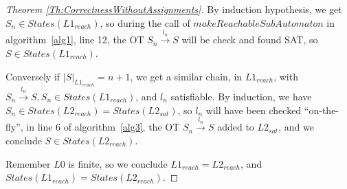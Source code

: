 \documentclass[smallcondensed]{svjour3}
\newcommand{\noteInEM}[2][inline,color=green!40]{\todo[#1]{{\bf Eric: } {#2}}}
\begin{document}
\begin{proof}[Theorem \ref{Th:CorrectnessWithoutAssignments}]
  By induction hypothesis, we get $S_{n} \in States(L1_{reach})$, so during the
  call of $makeReachableSubAutomaton$ in algorithm~\ref{alg1}, line 12, the OT
  $S_n \xrightarrow{l_{n}}S$ will be check and found SAT, so
  $S \in States(L1_{reach})$. 

  Conversely if $|S|_{L1_{reach}}=n+1$, we get a similar chain, in
  $L1_{reach}$, with $S_n \xrightarrow{l_{n}}S, S_n \in
  States(L1_{reach})$, and $l_n$ satisfiable. By induction, we have
  $S_n \in States(L2_{reach})=States(L2_{sat})$, so $l_n$ will have
  been checked ``on-the-fly'', in line 6 of algorithm~\ref{alg3},
  the OT $S_n \xrightarrow{l_{n}}S$ added to $L2_{sat}$, and we
  conclude $S \in States(L2_{reach})$.
  
Remember $L0$ is finite, so we conclude $L1_{reach}=L2_{reach}$, and $States(L1_{reach})=States(L2_{reach})$.





\end{proof}
\end{document}
